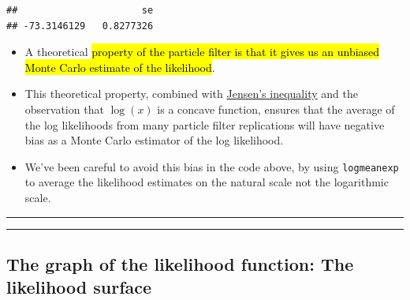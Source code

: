 \documentclass[]{article}
\begin{document}
\begin{verbatim}
##                      se 
## -73.3146129   0.8277326
\end{verbatim}


\begin{itemize}
\item
  A theoretical \hl{property of the particle filter is that it gives us an
  unbiased Monte Carlo estimate of the likelihood}.
\item
  This theoretical property, combined with
  \href{https://en.wikipedia.org/wiki/Jensen\%27s_inequality}{Jensen's
  inequality} and the observation that \(\log(x)\) is a concave
  function, ensures that the average of the log likelihoods from many
  particle filter replications will have negative bias as a Monte Carlo
  estimator of the log likelihood.
\item
  We've been careful to avoid this bias in the code above, by using
  \texttt{logmeanexp} to average the likelihood estimates on the natural
  scale not the logarithmic scale.
\end{itemize}

\begin{center}\rule{0.5\linewidth}{\linethickness}\end{center}

\begin{center}\rule{0.5\linewidth}{\linethickness}\end{center}

\subsection{The graph of the likelihood function: The likelihood
surface}\label{the-graph-of-the-likelihood-function-the-likelihood-surface}
\end{document}
